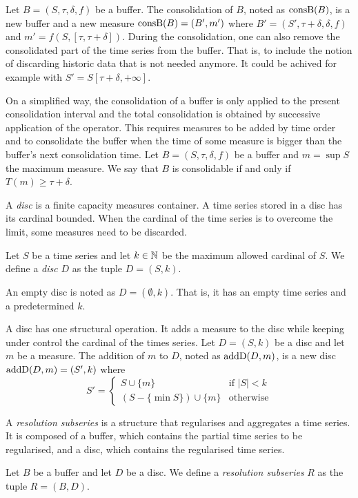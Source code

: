 Let $B=(S,\tau,\delta,f)$ be a buffer. The consolidation of $B$, noted
as $\operatorname{consB}(B)$, is a new buffer and a new measure $\operatorname{consB}(B)=(B',m')$
where $ B'= (S',\tau+\delta,\delta,f)$ and $m' =
f(S,[\tau,\tau+\delta])$. During the consolidation, one can also remove the
consolidated part of the time series from the buffer. That is, to
include the notion of discarding historic data that is not needed
anymore. It could be achived for example with $S' =
S[\tau+\delta,+\infty]$.


On a simplified way, the consolidation of a buffer is only applied to
the present consolidation interval and the total consolidation is
obtained by successive application of the operator. This requires
measures to be added by time order and to consolidate the buffer when
the time of some measure is bigger than the buffer's next
consolidation time.  Let $B=(S,\tau,\delta,f)$ be a buffer and
$m=\sup S$ the maximum measure. We say that $B$ is consolidable if and only if
$T(m) \geq \tau+\delta$.


A \emph{disc} is a finite capacity measures container. A time series
stored in a disc has its cardinal bounded. When the cardinal of the
time series is to overcome the limit, some measures need to be
discarded.
\begin{definition}%
  Let $S$ be a time series and let $k\in\mathbb{N}$ be the maximum allowed
  cardinal of $S$. We define a \emph{disc} $D$ as the tuple
  $D=(S,k)$. 
\end{definition}

An empty disc is noted as $D = (\emptyset,k)$. That is, it has an
empty time series and a predetermined $k$.

A disc has one structural operation.  It adds a measure to the disc
while keeping under control the cardinal of the times series. Let
$D=(S,k)$ be a disc and let $m$ be a measure.  The addition of $m$ to
$D$, noted as $\operatorname{addD}(D,m)$, is a new disc $\operatorname{addD}(D,m)=(S',k)$ where %
\[
 S' = \begin{cases}
  S\cup\{m\}                 & \text{if } |S|<k  \\
  (S-\{\min S\}) \cup \{m\} & \text{otherwise}
\end{cases}  
\]


A \emph{resolution subseries} is a structure that regularises and
aggregates a time series. It is composed of a buffer, which contains
the partial time series to be regularised, and a disc, which contains
the regularised time series.
\begin{definition}%
  Let $B$ be a buffer and let $D$ be a disc.  We define a
  \emph{resolution subseries} $R$ as the tuple $R=(B,D)$.  
\end{definition}
 
